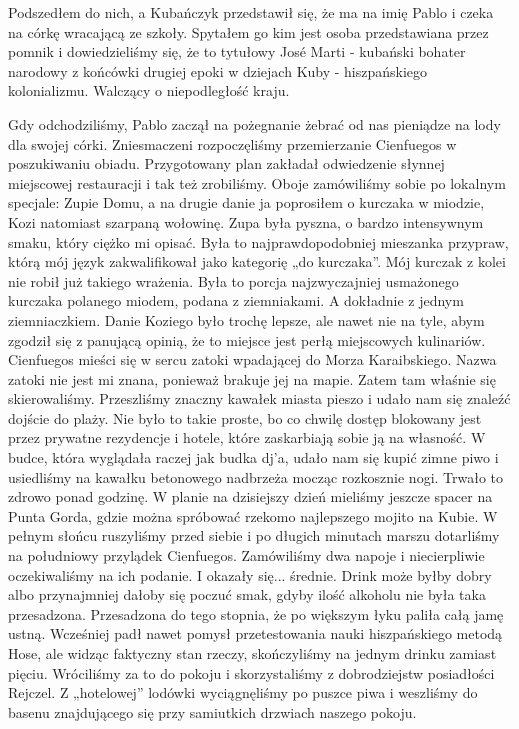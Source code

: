 Podszedłem do nich, a Kubańczyk przedstawił się, że ma na imię Pablo i czeka na córkę wracającą ze szkoły.
Spytałem go kim jest osoba przedstawiana przez pomnik i dowiedzieliśmy się, że to tytułowy José Marti - kubański bohater narodowy z końcówki drugiej epoki w dziejach Kuby - hiszpańskiego kolonializmu. Walczący o niepodległość kraju.
\par Gdy odchodziliśmy, Pablo zaczął na pożegnanie żebrać od nas pieniądze na lody dla swojej córki.
Zniesmaczeni rozpoczęliśmy przemierzanie Cienfuegos w poszukiwaniu obiadu.
Przygotowany plan zakładał odwiedzenie słynnej miejscowej restauracji i tak też zrobiliśmy.
Oboje zamówiliśmy sobie po lokalnym specjale: Zupie Domu, a na drugie danie ja poprosiłem o kurczaka w miodzie, Kozi natomiast szarpaną wołowinę.
Zupa była pyszna, o bardzo intensywnym smaku, który ciężko mi opisać.
Była to najprawdopodobniej mieszanka przypraw, którą mój język zakwalifikował jako kategorię „do kurczaka”.
Mój kurczak z kolei nie robił już takiego wrażenia.
Była to porcja najzwyczajniej usmażonego kurczaka polanego miodem, podana z ziemniakami.
A dokładnie z jednym ziemniaczkiem.
Danie Koziego było trochę lepsze, ale nawet nie na tyle, abym zgodził się z panującą opinią, że to miejsce jest perłą miejscowych kulinariów.
Cienfuegos mieści się w sercu zatoki wpadającej do Morza Karaibskiego.
Nazwa zatoki nie jest mi znana, ponieważ brakuje jej na mapie.
Zatem tam właśnie się skierowaliśmy.
Przeszliśmy znaczny kawałek miasta pieszo i udało nam się znaleźć dojście do plaży.
Nie było to takie proste, bo co chwilę dostęp blokowany jest przez prywatne rezydencje i hotele, które zaskarbiają sobie ją na własność.
W budce, która wyglądała raczej jak budka dj’a, udało nam się kupić zimne piwo i usiedliśmy na kawałku betonowego nadbrzeża mocząc rozkosznie nogi.
Trwało to zdrowo ponad godzinę.
W planie na dzisiejszy dzień mieliśmy jeszcze spacer na Punta Gorda, gdzie można spróbować rzekomo najlepszego mojito na Kubie.
W pełnym słońcu ruszyliśmy przed siebie i po długich minutach marszu dotarliśmy na południowy przylądek Cienfuegos.
Zamówiliśmy dwa napoje i niecierpliwie oczekiwaliśmy na ich podanie.
I okazały się...
średnie.
Drink może byłby dobry albo przynajmniej dałoby się poczuć smak, gdyby ilość alkoholu nie była taka przesadzona.
Przesadzona do tego stopnia, że po większym łyku paliła całą jamę ustną.
Wcześniej padł nawet pomysł przetestowania nauki hiszpańskiego metodą Hose, ale widząc faktyczny stan rzeczy, skończyliśmy na jednym drinku zamiast pięciu.
Wróciliśmy za to do pokoju i skorzystaliśmy z dobrodziejstw posiadłości Rejczel.
Z „hotelowej” lodówki wyciągnęliśmy po puszce piwa i weszliśmy do basenu znajdującego się przy samiutkich drzwiach naszego pokoju.